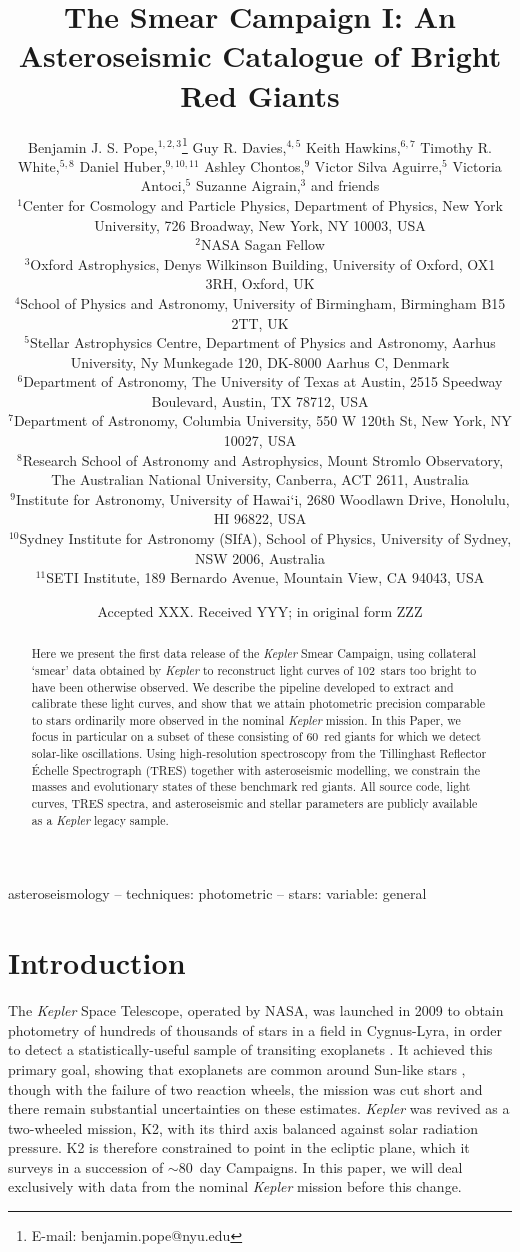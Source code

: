 \documentclass[a4paper,fleqn,usenatbib]{mnras}
\title[The Kepler Smear Campaign]{The \kepler Smear Campaign I: An Asteroseismic Catalogue of Bright Red Giants}
\author[B. J. S. Pope et al.]{Benjamin J. S. Pope,$^{1,2,3}$\thanks{E-mail: benjamin.pope@nyu.edu}
Guy R. Davies,$^{4,5}$
Keith Hawkins,$^{6,7}$
Timothy R. White,$^{5,8}$\newauthor
Daniel Huber,$^{9,10,11}$
Ashley Chontos,$^{9}$
Victor Silva Aguirre,$^{5}$
Victoria Antoci,$^{5}$\newauthor
Suzanne Aigrain,$^{3}$ and friends
\\
$^{1}$Center for Cosmology and Particle Physics, Department of Physics, New York University, 726 Broadway, New York, NY 10003, USA\\
$^{2}$NASA Sagan Fellow\\
$^{3}$Oxford Astrophysics, Denys Wilkinson Building, University of Oxford, OX1 3RH, Oxford, UK\\
$^{4}$School of Physics and Astronomy, University of Birmingham, Birmingham B15 2TT, UK\\
$^{5}$Stellar Astrophysics Centre, Department of Physics and Astronomy, Aarhus University, Ny Munkegade 120, DK-8000 Aarhus C, Denmark\\
$^{6}$Department of Astronomy, The University of Texas at Austin, 2515 Speedway Boulevard, Austin, TX 78712, USA\\
$^{7}$Department of Astronomy, Columbia University, 550 W 120th St, New York, NY 10027, USA\\
$^{8}$Research School of Astronomy and Astrophysics, Mount Stromlo Observatory, The Australian National University, Canberra, ACT 2611, Australia\\
$^{9}$Institute for Astronomy, University of Hawai‘i, 2680 Woodlawn Drive, Honolulu, HI 96822, USA\\
$^{10}$Sydney Institute for Astronomy (SIfA), School of Physics, University of Sydney, NSW 2006, Australia\\
$^{11}$SETI Institute, 189 Bernardo Avenue, Mountain View, CA 94043, USA
}
\date{Accepted XXX. Received YYY; in original form ZZZ}
\newcommand{\kepler}{\emph{Kepler}\xspace}
\begin{document}
\label{firstpage}
\pagerange{\pageref{firstpage}--\pageref{lastpage}}
\maketitle

\begin{abstract}
Here we present the first data release of the \kepler Smear Campaign, using collateral `smear' data obtained by \kepler to reconstruct light curves of 102~stars too bright to have been otherwise observed. We describe the pipeline developed to extract and calibrate these light curves, and show that we attain photometric precision comparable to stars ordinarily more observed in the nominal \kepler mission. In this Paper, we focus in particular on a subset of these consisting of 60~red giants for which we detect solar-like oscillations. Using high-resolution spectroscopy from the Tillinghast Reflector \'{E}chelle Spectrograph (TRES) together with asteroseismic modelling, we constrain the masses and evolutionary states of these benchmark red giants. All source code, light curves, TRES spectra, and asteroseismic and stellar parameters are publicly available as a \kepler legacy sample.
\end{abstract}

\begin{keywords}
asteroseismology -- techniques: photometric -- stars: variable: general
\end{keywords}



\section{Introduction}
\label{intro}

The \kepler Space Telescope, operated by NASA, was launched in 2009 to obtain photometry of hundreds of thousands of stars in a field in Cygnus-Lyra, in order to detect a statistically-useful sample of transiting exoplanets \citep{2010Sci...327..977B}. It achieved this primary goal, showing that exoplanets are common around Sun-like stars \citep{2013ApJ...766...81F,2013PNAS..11019273P,2014ApJ...795...64F}, though with the failure of two reaction wheels, the mission was cut short and there remain substantial uncertainties on these estimates. \kepler was revived as a two-wheeled mission, K2, with its third axis balanced against solar radiation pressure. K2 is therefore constrained to point in the ecliptic plane, which it surveys in a succession of $\sim 80$~day Campaigns. In this paper, we will deal exclusively with data from the nominal \kepler mission before this change.
\end{document}
